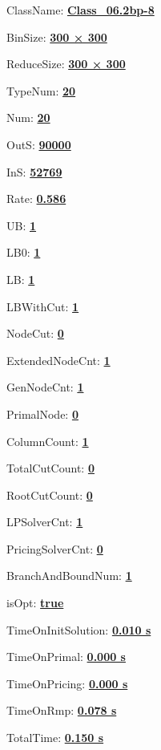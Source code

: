 \documentclass[11pt]{article}
\begin{document}
\pagestyle{empty}


ClassName: \underline{\textbf{Class_06.2bp-8}}
\par
BinSize: \underline{\textbf{300 × 300}}
\par
ReduceSize: \underline{\textbf{300 × 300}}
\par
TypeNum: \underline{\textbf{20}}
\par
Num: \underline{\textbf{20}}
\par
OutS: \underline{\textbf{90000}}
\par
InS: \underline{\textbf{52769}}
\par
Rate: \underline{\textbf{0.586}}
\par
UB: \underline{\textbf{1}}
\par
LB0: \underline{\textbf{1}}
\par
LB: \underline{\textbf{1}}
\par
LBWithCut: \underline{\textbf{1}}
\par
NodeCut: \underline{\textbf{0}}
\par
ExtendedNodeCnt: \underline{\textbf{1}}
\par
GenNodeCnt: \underline{\textbf{1}}
\par
PrimalNode: \underline{\textbf{0}}
\par
ColumnCount: \underline{\textbf{1}}
\par
TotalCutCount: \underline{\textbf{0}}
\par
RootCutCount: \underline{\textbf{0}}
\par
LPSolverCnt: \underline{\textbf{1}}
\par
PricingSolverCnt: \underline{\textbf{0}}
\par
BranchAndBoundNum: \underline{\textbf{1}}
\par
isOpt: \underline{\textbf{true}}
\par
TimeOnInitSolution: \underline{\textbf{0.010 s}}
\par
TimeOnPrimal: \underline{\textbf{0.000 s}}
\par
TimeOnPricing: \underline{\textbf{0.000 s}}
\par
TimeOnRmp: \underline{\textbf{0.078 s}}
\par
TotalTime: \underline{\textbf{0.150 s}}
\par
\newpage
\end{document}
